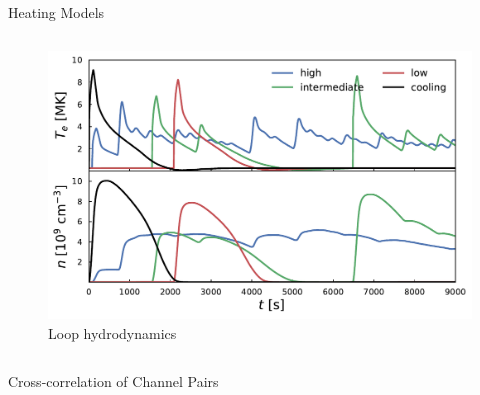 \documentclass[final]{beamer}
\begin{document}
\begin{frame}
\begin{columns}[T]
\begin{column}{0.49\linewidth}
\begin{block}{Heating Models}
\begin{columns}[T]
\begin{column}{0.49\columnwidth}
\begin{figure}
                \includegraphics[width=\columnwidth]{figures/hydrodynamic_nT.pdf}
                \caption{Loop hydrodynamics} 
                \label{fig:hydrodynamics}
            \end{figure}
        \end{column}
        \end{columns}
    \end{block}
    \begin{block}{Cross-correlation of Channel Pairs}
        \begin{columns}[T]
            \begin{column}{0.49\columnwidth}
            \begin{figure}
                \subfigure{%
}
\end{figure}
\end{column}
\end{columns}
\end{block}
\end{column}
\end{columns}
\end{frame}
\end{document}
